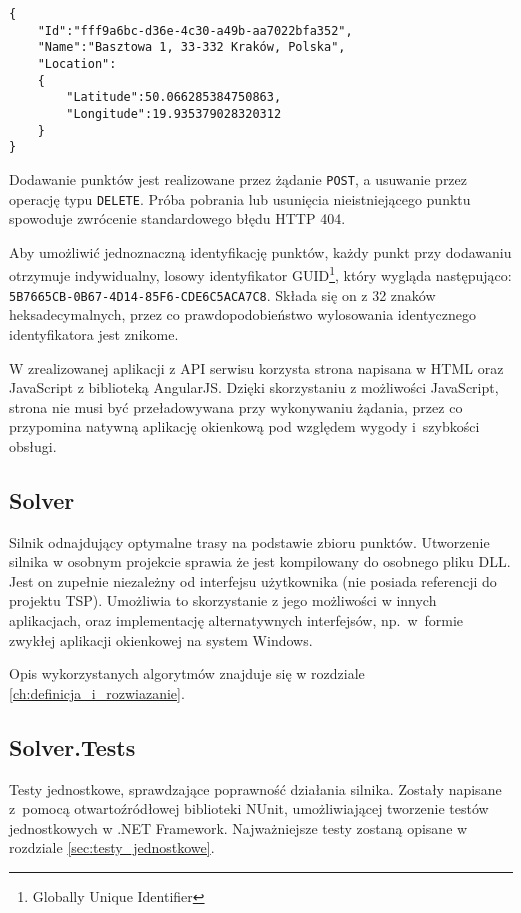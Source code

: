 \begin{verbatim}
{  
    "Id":"fff9a6bc-d36e-4c30-a49b-aa7022bfa352",
    "Name":"Basztowa 1, 33-332 Kraków, Polska",
    "Location": 
    {  
        "Latitude":50.066285384750863,
        "Longitude":19.935379028320312
    }
}
\end{verbatim}

Dodawanie punktów jest realizowane przez żądanie \texttt{POST}, a usuwanie przez operację typu \texttt{DELETE}. Próba pobrania lub usunięcia nieistniejącego punktu spowoduje zwrócenie standardowego błędu HTTP 404. 

Aby umożliwić jednoznaczną identyfikację punktów, każdy punkt przy dodawaniu otrzymuje indywidualny, losowy identyfikator GUID\footnote{Globally Unique Identifier}, który wygląda następująco: \texttt{5B7665CB-0B67-4D14-85F6-CDE6C5ACA7C8}. Składa się on z 32 znaków heksadecymalnych, przez co prawdopodobieństwo wylosowania identycznego identyfikatora jest znikome. 

W zrealizowanej aplikacji z API serwisu korzysta strona napisana w HTML oraz JavaScript z biblioteką AngularJS. Dzięki skorzystaniu z możliwości JavaScript, strona nie musi być przeładowywana przy wykonywaniu żądania, przez co przypomina natywną aplikację okienkową pod względem wygody i~szybkości obsługi.

\subsection*{Solver}

Silnik odnajdujący optymalne trasy na podstawie zbioru punktów. Utworzenie silnika w osobnym projekcie sprawia że jest kompilowany do osobnego pliku DLL. Jest on zupełnie niezależny od interfejsu użytkownika (nie posiada referencji do projektu TSP). Umożliwia to skorzystanie z jego możliwości w innych aplikacjach, oraz implementację alternatywnych interfejsów, np.~w~formie zwykłej aplikacji okienkowej na system Windows.

Opis wykorzystanych algorytmów znajduje się w rozdziale \ref{ch:definicja_i_rozwiazanie}.

\subsection*{Solver.Tests}

Testy jednostkowe, sprawdzające poprawność działania silnika. Zostały napisane z~pomocą otwartoźródłowej biblioteki NUnit, umożliwiającej tworzenie testów jednostkowych w .NET Framework. Najważniejsze testy zostaną opisane w rozdziale \ref{sec:testy_jednostkowe}.